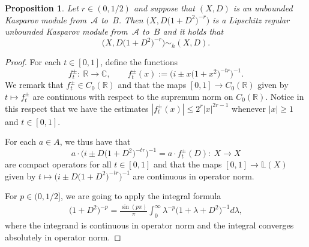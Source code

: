 \documentclass[pdftex]{sigma}
\numberwithin{equation}{section}
\newtheorem{prop}[Theorem]{Proposition}
 { \theoremstyle{definition}
\newtheorem{dfn}[Theorem]{Definition}
\newtheorem{exa}[Theorem]{Example}
\newtheorem{rem}[Theorem]{Remark} }
\newcommand{\cd}{\cdot}
\newcommand{\la}{\lambda}
\newcommand{\s}[1]{\mathscr{#1}}
\newcommand{\B}[1]{\mathbb{#1}}
\begin{document}
\begin{prop}\label{p:liphom}Let $r \in (0,1/2)$ and suppose that $(X,D)$ is an unbounded Kasparov module from~$\s A$ to~$B$. Then $\big(X,D\big(1 + D^2\big)^{-r}\big)$ is a Lipschitz regular unbounded Kasparov module from~$\s A$ to~$B$ and it holds that
\[
\big(X, D\big(1 + D^2\big)^{-r}\big) \sim_h (X,D) .
\]
\end{prop}
\begin{proof}For each $t \in [0,1]$, define the functions
\[
f_t^{\pm}\colon \ \B R \to \B C, \qquad f_t^{\pm}(x) := \big( i \pm x \big(1 + x^2\big)^{-tr} \big)^{-1} .
\]
We remark that $f_t^{\pm} \in C_0( \B R )$ and that the maps $[0,1] \to C_0(\B R)$ given by $t \mapsto f_t^{\pm}$ are continuous with respect to the supremum norm on $C_0( \B R)$. Notice in this respect that we have the estimates $| f_t^{\pm}(x) | \leq 2^r |x|^{2r - 1}$ whenever $|x| \geq 1$ and $t \in [0,1]$.

For each $a \in A$, we thus have that
\[
a \cd \big(i \pm D\big(1 + D^2\big)^{-tr}\big)^{-1} = a \cd f_t^{\pm}(D)\colon \ X \to X
\]
are compact operators for all $t \in [0,1]$ and that the maps $[0,1] \to \B L(X)$ given by $t \mapsto \big(i \pm D\big(1 + D^2\big)^{-tr}\big)^{-1}$ are continuous in operator norm.

For $p \in (0,1/2]$, we are going to apply the integral formula
\begin{gather}\label{eq:intpow}
\big(1 + D^2\big)^{-p} = \frac{\sin(p \pi)}{\pi} \int_0^\infty \la^{-p} \big(1 + \la + D^2\big)^{-1} d\la ,
\end{gather}
where the integrand is continuous in operator norm and the integral converges absolutely in operator norm.


\end{proof}
\end{document}
